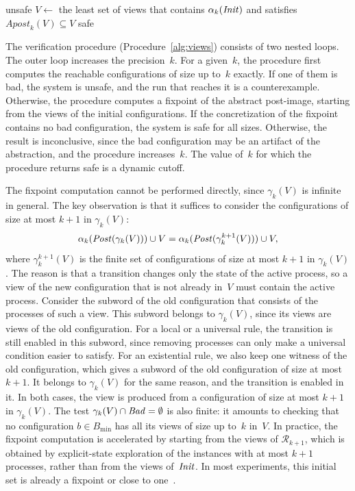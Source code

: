 \begin{algorithm}[t]
\caption{Verification by view abstraction}
\label{alg:views}
\begin{algorithmic}[1]
    \RETURN unsafe
  \ENDIF
  \STATE $V \leftarrow$ the least set of views that contains $\alpha_k(\mathit{Init})$ and satisfies $\mathit{Apost}_k(V) \subseteq V$
    \RETURN safe
  \ENDIF
\ENDFOR
\end{algorithmic}
\end{algorithm}

The verification procedure (Procedure~\ref{alg:views}) consists of two nested
loops. The outer loop increases the precision~$k$. For a given~$k$, the
procedure first computes the reachable configurations of size up to~$k$
exactly. If one of them is bad, the system is unsafe, and the run that reaches
it is a counterexample. Otherwise, the procedure computes a fixpoint of the
abstract post-image, starting from the views of the initial configurations. If
the concretization of the fixpoint contains no bad configuration, the system is
safe for all sizes. Otherwise, the result is inconclusive, since the bad
configuration may be an artifact of the abstraction, and the procedure
increases~$k$. The value of~$k$ for which the procedure returns safe is a
dynamic cutoff.

The fixpoint computation cannot be performed directly, since $\gamma_k(V)$ is
infinite in general. The key observation is that it suffices to consider the
configurations of size at most $k+1$ in $\gamma_k(V)$:
\[
\alpha_k(\mathit{Post}(\gamma_k(V))) \cup V
= \alpha_k(\mathit{Post}(\gamma_k^{k+1}(V))) \cup V ,
\]
where $\gamma_k^{k+1}(V)$ is the finite set of configurations of size at most
$k+1$ in $\gamma_k(V)$. The reason is that a transition changes only the state
of the active process, so a view of the new configuration that is not already
in~$V$ must contain the active process. Consider the subword of the old
configuration that consists of the processes of such a view. This subword
belongs to $\gamma_k(V)$, since its views are views of the old configuration.
For a local or a universal rule, the transition is still enabled in this
subword, since removing processes can only make a universal condition easier
to satisfy. For an existential rule, we also keep one witness of the old
configuration, which gives a subword of the old configuration of size at most
$k+1$. It belongs to $\gamma_k(V)$ for the same reason, and the transition is
enabled in it. In both cases, the view is produced from a
configuration of size at most $k+1$ in $\gamma_k(V)$. The test $\gamma_k(V)
\cap \mathit{Bad} = \emptyset$ is also finite: it amounts to checking that no configuration $b \in B_{\min}$ has all
its views of size up to~$k$ in~$V$. In practice, the fixpoint computation is
accelerated by starting from the views of $\mathcal{R}_{k+1}$, which is
obtained by explicit-state exploration of the instances with at most $k+1$
processes, rather than from the views of~$\mathit{Init}$. In most experiments, this
initial set is already a fixpoint or close to one~\cite{AHH16}.

